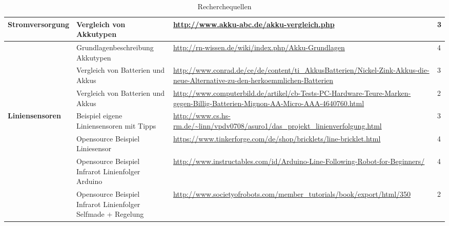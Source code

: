 \begin{table}[h]
\begin{tabular}{|p{3cm}|p{3.5cm}|p{5cm}|p{2cm}|}
\textbf{Stromversorgung}	&	Vergleich von Akkutypen	&	\url{http://www.akku-abc.de/akku-vergleich.php}	&	3 \\\hline
				 			&	Grundlagenbeschreibung Akkutypen 	&	\url{http://rn-wissen.de/wiki/index.php/Akku-Grundlagen}	&	4 \\\hline
				 			&	Vergleich von Batterien und Akkus	&	\url{http://www.conrad.de/ce/de/content/ti_AkkusBatterien/Nickel-Zink-Akkus-die-neue-Alternative-zu-den-herkoemmlichen-Batterien}	&	3 \\\hline
				 			&	Vergleich von Batterien und Akkus	&	\url{http://www.computerbild.de/artikel/cb-Tests-PC-Hardware-Teure-Marken-gegen-Billig-Batterien-Mignon-AA-Micro-AAA-4640760.html } & 2	\\\hline
				 			
\textbf{Liniensensoren}	&	Beispiel eigene Liniensensoren mit Tipps	&	\url{http://www.cs.hs-rm.de/~linn/vpdv0708/asuro1/das_projekt_linienverfolgung.html}	&	3 \\\hline
				 			&	Opensource Beispiel Liniesensor	&	\url{https://www.tinkerforge.com/de/shop/bricklets/line-bricklet.html}	&	4 \\\hline
 				 			&	Opensource Beispiel Infrarot Linienfolger Arduino	&	\url{http://www.instructables.com/id/Arduino-Line-Following-Robot-for-Beginners/}	&	4 \\\hline
 				 			&	Opensource Beispiel Infrarot Linienfolger Selfmade + Regelung	&	\url{http://www.societyofrobots.com/member_tutorials/book/export/html/350}	&	2 \\\hline
	
\end{tabular}\\
\caption{Recherchequellen}
\end{table}